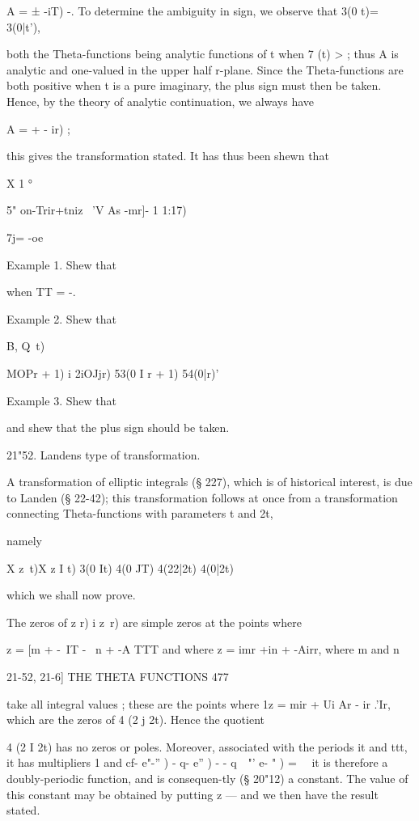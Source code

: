 A = ± -iT) -. To determine the ambiguity in sign, we observe that 3(0
t)= 3(0|t'),

both the Theta-functions being analytic functions of t when 7 (t) > ;
thus A is analytic and one-valued in the upper half r-plane. Since the
Theta-functions are both positive when t is a pure imaginary, the plus
sign must then be taken. Hence, by the theory of analytic
continuation, we always have

A = + - ir) ;

this gives the transformation stated. It has thus been shewn that

X 1 °

5" on-Trir+tniz \ 'V As -mr]- 1 1:17)



7j= -oe

Example 1. Shew that

when TT = -.

Example 2. Shew that



B, Q\ t) \ %



MOPr + 1) i 2iOJjr) 53(0 I r + 1) 54(0|r)'



Example 3. Shew that

and shew that the plus sign should be taken.

21"52. Landens type of transformation.

A transformation of elliptic integrals (§ 227), which is of historical
interest, is due to Landen (§ 22-42); this transformation follows at
once from a transformation connecting Theta-functions with parameters
t and 2t,

namely

X z\ t)X z I t) 3(0 It) 4(0 JT) 4(22|2t) 4(0|2t)

which we shall now prove.

The zeros of z r) i z\ r) are simple zeros at the points where

z = [m + -\ IT - \ n + -A TTT and where z = imr +in + -Airr, where m
and n



21-52, 21-6] THE THETA FUNCTIONS 477

take all integral values ; these are the points where 1z = mir + Ui Ar
- ir .'Ir, which are the zeros of 4 (2 j 2t). Hence the quotient

 4 (2 I 2t) has no zeros or poles. Moreover, associated with the
periods it and ttt, it has multipliers 1 and cf- e"-'' ) - q- e'' ) -
- q~~"' e- " ) = \ \ it is therefore a doubly-periodic function, and
is consequen-tly (§ 20"12) a constant. The value of this constant may
be obtained by putting z — and we then have the result stated.

